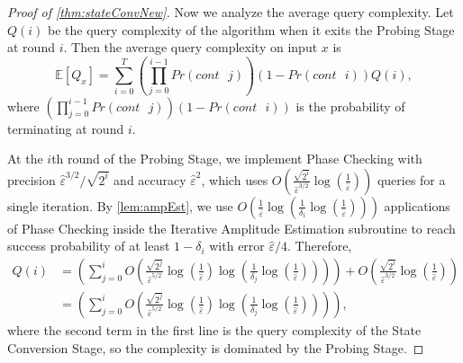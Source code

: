 \documentclass[cleveref, autoref, thm-restate,11pt]{article}
\theoremstyle{definition}
\newcommand{\PrCont}[1][i]{Pr(cont\textrm{ }#1)} %
\begin{document}
\begin{proof}[Proof of \cref{thm:stateConvNew}]
Now we analyze the average query complexity.
Let $Q(i)$ be the query complexity of the algorithm when it exits the Probing Stage at round $i$.
Then the average query complexity on input $x$ is
\begin{equation}
    \mathbb{E}[Q_x]=\sum_{i=0}^T \left( \prod_{j=0}^{i-1}\PrCont[j] \right)\left(1-\PrCont[i]\right) Q(i),
\end{equation}
where $\left( \prod_{j=0}^{i-1}\PrCont[j] \right)\left(1-\PrCont[i]\right)$ is the probability of terminating at round $i$.

At the $i$th round of the Probing Stage, we implement
Phase Checking with precision $\hat{\varepsilon}^{3/2}/\sqrt{2^i}$ and
accuracy $\hat{\varepsilon}^2$, which uses $O\left(\frac{\sqrt{2^i
}}{\hat{\varepsilon}^{3/2}}\log\left(\frac{1}{\hat{\varepsilon}}\right)\right)$ queries for a single iteration. 
By \cref{lem:ampEst}, we use
$O\left(\frac{1}{\hat{\varepsilon}}\log\left(\frac{1}{\delta_i}\log\left(\frac{1}{\hat{\varepsilon}}\right)\right)\right)$ 
applications of Phase Checking inside the Iterative Amplitude Estimation subroutine to reach success probability of at least
$1-\delta_i$ with error $\hat{\varepsilon}/4$. 
Therefore,
\begin{align}
Q(i)&=\left(\sum_{j=0}^i O\left(\frac{\sqrt{2^j
}}{\hat{\varepsilon}^{5/2}}\log\left(\frac{1}{\hat{\varepsilon}}\right) \log\left(\frac{1}{\delta_j}\log\left(\frac{1}{\hat{\varepsilon}}\right)\right)\right)
\right)+O\left(\frac{\sqrt{2^i
}}{\hat{\varepsilon}^{3/2}}\log\left(\frac{1}{\hat{\varepsilon}}\right)\right)\nonumber\\
&=\left(\sum_{j=0}^i O\left(\frac{\sqrt{2^j
}}{\hat{\varepsilon}^{5/2}}\log\left(\frac{1}{\hat{\varepsilon}}\right) \log\left(\frac{1}{\delta_j}\log\left(\frac{1}{\hat{\varepsilon}}\right)\right)\right)
\right),
\end{align}
where the second term in the first line is the query complexity of the State Conversion Stage,
so the complexity is dominated by the Probing Stage.







\end{proof}
\end{document}

